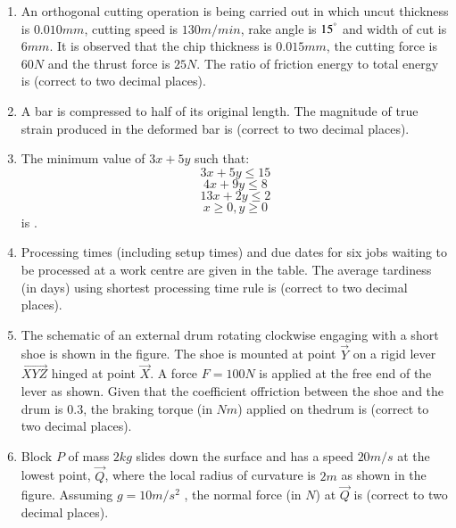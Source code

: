 \documentclass[journal]{IEEEtran}
\begin{document}
\begin{enumerate}
    \item An orthogonal cutting operation is being carried out in which uncut thickness is $0.010 mm$, cutting speed is $130 m/min$, rake angle is $15^\degree$ and width of cut is $6 mm$. It is observed that the chip thickness is $0.015 mm$, the cutting force is $60 N$ and the thrust force is $25 N$. The ratio of friction energy to total energy is \underline{\hspace{1cm}} (correct to two decimal places). 

    \item A bar is compressed to half of its original length. The magnitude of true strain produced in the deformed bar is \underline{\hspace{1cm}} (correct to two decimal places).

    \item The minimum value of $3x+5y$ such that:
        $$3x+5y\leq15$$
        $$4x+9y\leq8$$
        $$13x+2y\leq2$$
        $$x\geq0,y\geq0$$
        is \underline{\hspace{1cm}}.

    \item Processing times (including setup times) and due dates for six jobs waiting to be processed at a work centre are given in the table. The average tardiness (in days) using shortest processing time rule is \underline{\hspace{1cm}} (correct to two decimal places).
        \begin{table}[!ht]
            \centering
            
        \end{table}

    \item The schematic of an external drum rotating clockwise engaging with a short shoe is shown in the figure. The shoe is mounted at point $\vec{Y}$ on a rigid lever $\vec{XYZ}$ hinged at point $\vec{X}$. A force $F = 100 N$ is applied at the free end of the lever as shown. Given that the coefficient offriction between the shoe and the drum is $0.3$, the braking torque (in $Nm$) applied on thedrum is \underline{\hspace{1cm}} (correct to two decimal places).
        \begin{figure}[!ht]
            \centering
            
        \end{figure}

    \item Block $P$ of mass $2 kg$ slides down the surface and has a speed $20 m/s$ at the lowest point, $\vec{Q}$, where the local radius of curvature is $2 m$ as shown in the figure. Assuming $g = 10 m/s^2$  , the normal force (in $N$) at $\vec{Q}$ is \underline{\hspace{1cm}} (correct to two decimal places).
        \begin{figure}[!ht]
            \centering
            
        \end{figure}


\end{enumerate}
\end{document}

